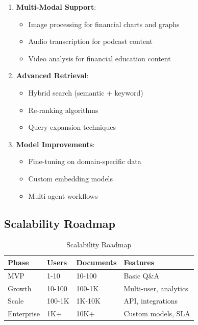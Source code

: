 \documentclass[12pt,a4paper]{article}
\begin{document}
\begin{enumerate}
    \item \textbf{Multi-Modal Support}:
    \begin{itemize}
        \item Image processing for financial charts and graphs
        \item Audio transcription for podcast content
        \item Video analysis for financial education content
    \end{itemize}
    
    \item \textbf{Advanced Retrieval}:
    \begin{itemize}
        \item Hybrid search (semantic + keyword)
        \item Re-ranking algorithms
        \item Query expansion techniques
    \end{itemize}
    
    \item \textbf{Model Improvements}:
    \begin{itemize}
        \item Fine-tuning on domain-specific data
        \item Custom embedding models
        \item Multi-agent workflows
    \end{itemize}
\end{enumerate}

\subsection{Scalability Roadmap}

\begin{table}[H]
\centering
\begin{tabular}{@{}llll@{}}
\toprule
\textbf{Phase} & \textbf{Users} & \textbf{Documents} & \textbf{Features} \\
\midrule
MVP & 1-10 & 10-100 & Basic Q\&A \\
Growth & 10-100 & 100-1K & Multi-user, analytics \\
Scale & 100-1K & 1K-10K & API, integrations \\
Enterprise & 1K+ & 10K+ & Custom models, SLA \\
\bottomrule
\end{tabular}
\caption{Scalability Roadmap}
\end{table}
\end{document}
